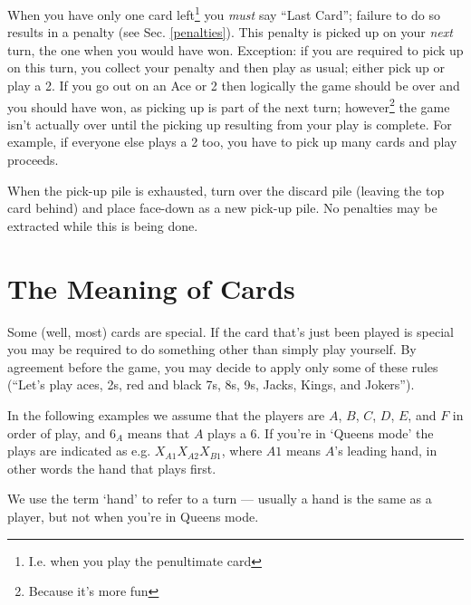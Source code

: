 \documentclass[12pt]{article}
\newcommand{\Sec}[1]{Sec. \ref{#1}}
\begin{document}
When you have only one card left\footnote{I.e. when you play the penultimate card} you \emph{must} say ``Last
Card''; failure to do so results in a penalty (see \Sec{penalties}).  This penalty is picked up on your
\textit{next} turn, the one when you would have won. Exception: if you are required to pick up on this turn,
you collect your penalty and then play as usual; either pick up or play a 2.
If you go out on an Ace or 2 then logically the game should be over and you should have won, as picking up
is part of the next turn;  however\footnote{Because it's more fun}
the game isn't actually over until the picking up resulting from your play is complete.
For example, if everyone
else plays a 2 too, you have to pick up many cards and play proceeds.

When the pick-up pile is exhausted, turn over the discard pile (leaving the top card behind) and
place face-down as a new pick-up pile.  No penalties may be extracted while this is being
done.

\section{The Meaning of Cards}
\label{specialCards}

Some (well, most) cards are special.  If the card that's just been played is special you may be required to
do something other than simply play yourself.  By agreement before the game, you may decide to apply only
some of these rules (``Let's play aces, 2s, red and black 7s, 8s, 9s, Jacks, Kings, and Jokers'').

In the following examples we assume that the players are $A$, $B$, $C$, $D$, $E$, and $F$ in order of play,
and $6_A$ means that $A$ plays a 6.  If you're in `Queens mode' the plays are indicated as e.g. $X_{A1} X_{A2} X_{B1}$,
where $A1$ means $A$'s leading hand, in other words the hand that plays first.

We use the term `hand' to refer to a turn --- usually a hand is the same as a player, but not when
you're in Queens mode.
\end{document}
